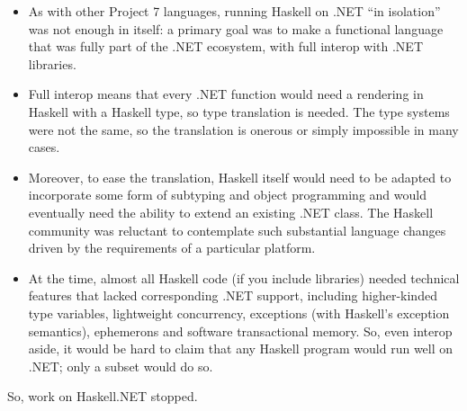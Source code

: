 \documentclass[acmsmall,review]{acmart}\settopmatter{printfolios=true,printccs=false,printacmref=false}
\begin{document}
\begin{itemize}
\item As with other Project 7 languages, running Haskell on .NET “in isolation” was not enough in itself: a primary goal was to make a functional language that was fully part of the .NET ecosystem, with full interop with .NET libraries. 
\item Full interop means that every .NET function would need a rendering in Haskell with a Haskell type, so type translation is needed. The type systems were not the same, so the translation is onerous or simply impossible in many cases.  
\item Moreover, to ease the translation, Haskell itself would need to be adapted to incorporate some form of subtyping and object programming and would eventually need the ability to extend an existing .NET class.   The Haskell community was reluctant to contemplate such substantial language changes driven by the requirements of a particular platform. 
\item At the time, almost all Haskell code (if you include libraries) needed technical features that lacked corresponding .NET support, including higher-kinded type variables, lightweight concurrency, exceptions (with Haskell’s exception semantics), ephemerons and software transactional memory. So, even interop aside, it would be hard to claim that any Haskell program would run well on .NET; only a subset would do so.   
\end{itemize}
So, work on Haskell.NET stopped.
\end{document}
